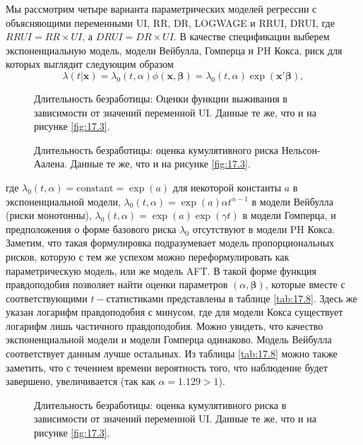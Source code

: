 Мы рассмотрим четыре варианта параметрических моделей регрессии с объясняющими переменными UI, RR, DR, LOGWAGE и RRUI, DRUI, где $RRUI = RR \times UI$, а $DRUI = DR \times UI$. В качестве спецификации выберем экспоненциальную модель, модели Вейбулла, Гомперца и PH Кокса, риск для которых выглядит следующим образом
        $$\lambda(t|\mathbf{x})=\lambda_0(t,\alpha)\phi(\mathbf{x},\bm{\beta})=\lambda_0(t,\alpha)\exp(\mathbf{x}'\bm{\beta}),$$
    \begin{figure}[ht!]\caption{Длительность безработицы: Оценки функции выживания в зависимости от значений переменной UI. Данные те же, что и на рисунке \ref{fig:17.3}.}\label{fig:17.4}
    \centering
    \end{figure}
    \begin{figure}[ht!]\caption{Длительность безработицы: оценка кумулятивного риска Нельсон-Аалена. Данные те же, что и на рисунке \ref{fig:17.3}.}\label{fig:17.5}
    \centering
    \end{figure}
где $\lambda_0(t,\alpha)=\textrm{constant}=\exp(a)$ для некоторой константы $a$ в экспоненциальной модели, $\lambda_0(t,\alpha)=\exp(a)\alpha t^{\alpha-1}$ в модели Вейбулла (риски монотонны), $\lambda_0(t,\alpha)=\exp(a)\exp(\gamma t)$ в модели Гомперца, и предположения о форме базового риска $\lambda_0$ отсутствуют в модели PH Кокса. Заметим, что такая формулировка подразумевает модель пропорциональных рисков, которую с тем же успехом можно переформулировать как параметрическую модель, или же модель AFT. В такой форме функция правдоподобия позволяет найти оценки параметров $(\alpha,\bm{\beta})$, которые вместе с соответствующими $t-$статистиками представлены в таблице \ref{tab:17.8}. Здесь же указан логарифм правдоподобия с минусом, где для модели Кокса существует логарифм лишь частичного правдоподобия. Можно увидеть, что качество экспоненциальной модели и модели Гомперца одинаково. Модель Вейбулла соответствует данным лучше остальных. Из таблицы \ref{tab:17.8} можно также заметить, что с течением времени вероятность того, что наблюдение будет завершено, увеличивается (так как $\alpha=1.129>1$).

\begin{figure}[ht!]\caption{Длительность безработицы: оценка кумулятивного риска в зависимости от значений переменной UI. Данные те же, что и на рисунке \ref{fig:17.3}.}\label{fig:17.6}
\centering
\end{figure}

